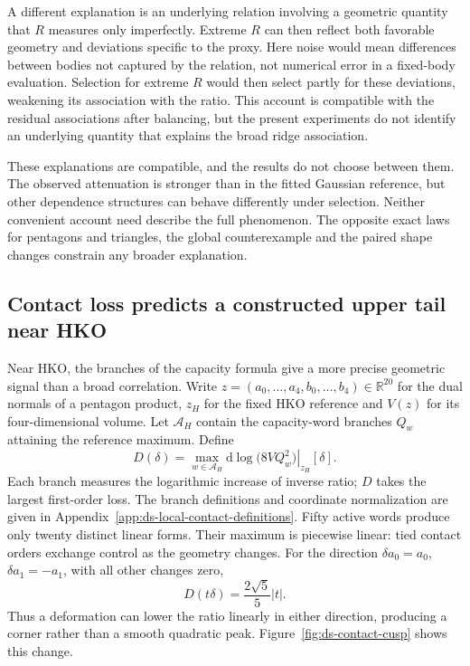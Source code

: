 A different explanation is an underlying relation involving a geometric
quantity that $R$ measures only imperfectly. Extreme $R$ can then reflect
both favorable geometry and deviations specific to the proxy. Here noise
would mean differences between bodies not captured by the relation, not
numerical error in a fixed-body evaluation. Selection for extreme $R$ would then select partly for these deviations,
weakening its association with the ratio. This account is compatible with
the residual associations after balancing, but the present experiments do not
identify an underlying quantity that explains the broad ridge association.

These explanations are compatible, and the results do not choose between
them. The observed attenuation is stronger than in the fitted Gaussian
reference, but other dependence structures can behave differently under
selection. Neither convenient account need describe the full phenomenon.
The opposite exact laws for pentagons and triangles, the global
counterexample and the paired shape changes constrain any broader
explanation.

\subsection{Contact loss predicts a constructed upper tail near HKO}
\label{subsec:ds-local-contact-loss}

Near HKO, the branches of the capacity formula give a more precise geometric
signal than a broad correlation. Write
$z=(a_0,\ldots,a_4,b_0,\ldots,b_4)\in\mathbb R^{20}$ for the dual normals
of a pentagon product, $z_H$ for the fixed HKO reference and $V(z)$ for its
four-dimensional volume. Let $\mathcal A_H$ contain the capacity-word branches
$Q_w$ attaining the reference maximum. Define
\[
 D(\delta)=\max_{w\in\mathcal A_H}
 \left.\mathrm d\log\bigl(8VQ_w^2\bigr)\right|_{z_H}[\delta].
\]
Each branch measures the logarithmic increase of inverse ratio; $D$ takes
the largest first-order loss. The branch definitions and coordinate
normalization are given in Appendix~\ref{app:ds-local-contact-definitions}.
Fifty active words produce only twenty distinct linear forms. Their maximum
is piecewise linear: tied contact orders exchange control as the geometry
changes. For the direction $\delta a_0=a_0$, $\delta a_1=-a_1$, with all
other changes zero,
\[
 D(t\delta)=\frac{2\sqrt5}{5}|t|.
\]
Thus a deformation can lower the ratio linearly in either direction,
producing a corner rather than a smooth quadratic peak. Figure~\ref{fig:ds-contact-cusp} shows this change.

